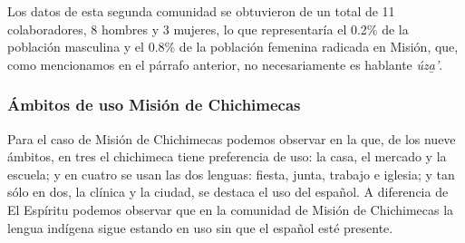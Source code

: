 \documentclass[output=paper]{../langscibook}
\begin{document}
Los datos de esta segunda comunidad se obtuvieron de un total de 11 colaboradores, 8 hombres y 3 mujeres, lo que representaría el 0.2\% de la población masculina y el 0.8\% de la población femenina radicada en Misión, que, como mencionamos en el párrafo anterior, no necesariamente es hablante \textit{úza̱’}.


 \subsubsection{Ámbitos de uso Misión de Chichimecas}


Para el caso de Misión de Chichimecas podemos observar en la  que, de los nueve ámbitos, en tres el chichimeca tiene preferencia de uso: la casa, el mercado y la escuela; y en cuatro se usan las dos lenguas: fiesta, junta, trabajo e iglesia; y tan sólo en dos, la clínica y la ciudad, se destaca el uso del español. A diferencia de El Espíritu podemos observar que en la comunidad de Misión de Chichimecas la lengua indígena sigue estando en uso sin que el español esté presente.
\end{document}
